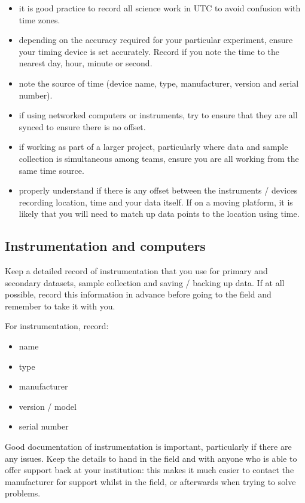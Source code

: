 \documentclass[a4paper,oneside]{report}
\providecommand{\tightlist}{%
  \setlength{\itemsep}{0pt}\setlength{\parskip}{0pt}}
\begin{document}
\begin{itemize}
\tightlist
\item
  it is good practice to record all science work in UTC to avoid
  confusion with time zones.
\item
  depending on the accuracy required for your particular experiment,
  ensure your timing device is set accurately. Record if you note the
  time to the nearest day, hour, minute or second.
\item
  note the source of time (device name, type, manufacturer, version and
  serial number).
\item
  if using networked computers or instruments, try to ensure that they
  are all synced to ensure there is no offset.
\item
  if working as part of a larger project, particularly where data and
  sample collection is simultaneous among teams, ensure you are all
  working from the same time source.
\item
  properly understand if there is any offset between the instruments /
  devices recording location, time and your data itself. If on a moving
  platform, it is likely that you will need to match up data points to
  the location using time.
\end{itemize}

\hypertarget{instrumentation-and-computers}{%
\subsection{Instrumentation and
computers}\label{instrumentation-and-computers}}

Keep a detailed record of instrumentation that you use for primary and
secondary datasets, sample collection and saving / backing up data. If
at all possible, record this information in advance before going to the
field and remember to take it with you.

For instrumentation, record:

\begin{itemize}
\tightlist
\item
  name
\item
  type
\item
  manufacturer
\item
  version / model
\item
  serial number
\end{itemize}

Good documentation of instrumentation is important, particularly if
there are any issues. Keep the details to hand in the field and with
anyone who is able to offer support back at your institution: this makes
it much easier to contact the manufacturer for support whilst in the
field, or afterwards when trying to solve problems.
\end{document}
